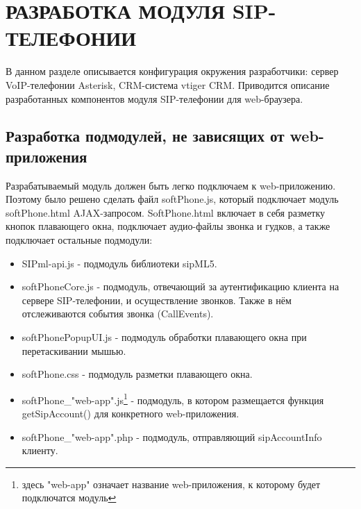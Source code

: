 \chapter{РАЗРАБОТКА МОДУЛЯ SIP-ТЕЛЕФОНИИ}

В данном разделе описывается конфигурация окружения разработчики: сервер VoIP-телефонии Asterisk, CRM-система vtiger CRM. Приводится описание разработанных компонентов модуля SIP-телефонии для web-браузера.

\section{Разработка подмодулей, не зависящих от web-приложения}

Разрабатываемый модуль должен быть легко подключаем к web-приложению. Поэтому было решено сделать файл softPhone.js, который подключает модуль softPhone.html AJAX-запросом. SoftPhone.html включает в себя разметку кнопок плавающего окна, подключает аудио-файлы звонка и гудков, а также подключает остальные подмодули:
\begin{itemize}
\item SIPml-api.js - подмодуль библиотеки sipML5.
\item softPhoneCore.js - подмодуль, отвечающий за аутентификацию клиента на сервере SIP-телефонии, и осуществление звонков. Также в нём отслеживаются события звонка (CallEvents).
\item softPhonePopupUI.js - подмодуль обработки плавающего окна при перетаскивании мышью.
\item softPhone.css - подмодуль разметки плавающего окна.
\item softPhone\_"web-app".js\footnote{здесь "web-app" означает название web-приложения, к которому будет подключатся модуль} - подмодуль, в котором размещается функция getSipAccount() для конкретного web-приложения.
\item softPhone\_"web-app".php - подмодуль, отправляющий sipAccountInfo клиенту.
\end{itemize}


